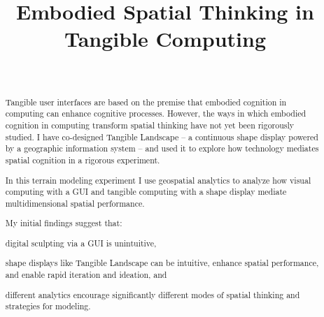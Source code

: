 \documentclass{sigchi}
\begin{document}
\title{Embodied Spatial Thinking in Tangible Computing}

\author{%
  \\
}

\maketitle


\begin{abstract} %

Tangible user interfaces are based on the premise
that embodied cognition in computing
can enhance cognitive processes.
%
However, the ways in which embodied cognition in computing
transform spatial thinking have not yet been rigorously studied.
%
I have co-designed Tangible Landscape --
a continuous shape display 
powered by a geographic information system --
and used it to explore how 
technology mediates spatial cognition %
in a rigorous experiment. 

In this terrain modeling experiment 
I use geospatial analytics 
to analyze how %
visual computing with a GUI
and tangible computing with a shape display
mediate multidimensional spatial performance. 

My initial findings suggest that: 
\begin{enumerate*}[label=\bfseries \arabic*.]
\item digital sculpting via a GUI 
is unintuitive, 
\item shape displays like Tangible Landscape can be intuitive, 
enhance spatial performance, and
enable rapid iteration and ideation,
and
\item different analytics encourage 
significantly different modes of spatial thinking 
and strategies for modeling. 
\end{enumerate*}


\end{abstract}
\end{document}
